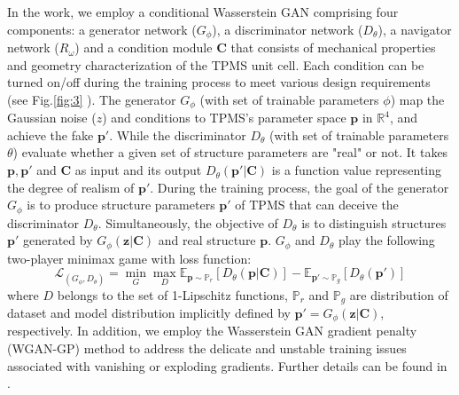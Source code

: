 \documentclass[preprint,review,12pt,authoryear]{elsarticle}
\begin{document}
In the work, we employ a conditional Wasserstein GAN comprising four components: a generator network ($G_\phi$), a discriminator network ($D_\theta$),  a navigator network ($R_\omega$) and a condition module $\boldsymbol{C}$ that consists of mechanical properties and geometry characterization of the TPMS unit cell. Each condition can be turned on/off during the training process to meet various design requirements (see Fig.\ref{fig:3} ). The generator $G_\phi$ (with set of trainable parameters $\phi$) map the Gaussian noise ($z$) and conditions to TPMS's parameter space $\boldsymbol{p}$ in $\mathbb{R}^4$, and achieve the fake $\boldsymbol{p}'$. While the discriminator $D_\theta$ (with set of trainable parameters $\theta$) evaluate whether a given set of structure parameters are "real" or not. It takes $\boldsymbol{p},\boldsymbol{p}'$ and  $\boldsymbol{C}$ as input and its output $D_\theta(\boldsymbol{p}'|\boldsymbol{C})$ is a function value representing the degree of realism of $\boldsymbol{p}'$. During the training process, the goal of the generator $G_\phi$ is to produce structure parameters $\boldsymbol{p}'$ of TPMS that can deceive the discriminator $D_\theta$. Simultaneously, the objective of $D_\theta$ is to distinguish structures $\boldsymbol{p}'$ generated by $G_\phi(\boldsymbol{z}|\boldsymbol{C})$ and real structure $\boldsymbol{p}$. $G_\phi$ and $D_\theta$ play the following two-player minimax game with loss function:
\begin{equation}
\mathcal{L}_{(G_\phi, D_\theta)}= \min_G \max_{D} \mathbb{E}_{\boldsymbol{p} \sim \mathbb{P}_r} \left[ D_\theta(\boldsymbol{p}|\boldsymbol{C}) \right] - \mathbb{E}_{\boldsymbol{p}' \sim \mathbb{P}_g} \left[ D_\theta (\boldsymbol{p}') \right]
\label{eq:7}
\end{equation}
where $D$ belongs to the set of 1-Lipschitz functions, $\mathbb{P}_r$ and $\mathbb{P}_g$ are distribution of dataset and model distribution implicitly defined by $\boldsymbol{p}'=G_\phi(\boldsymbol{z}|\boldsymbol{C}) $, respectively. In addition, we employ the Wasserstein GAN gradient penalty (WGAN-GP) method to address the delicate and unstable training issues associated with vanishing or exploding gradients. Further details can be found in \citep{Gulrajani2017}.
\end{document}
